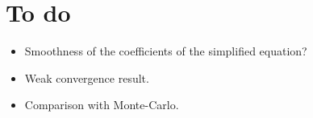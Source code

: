 \section*{To do}
\label{sec:to_do}
\begin{itemize}
   \item Smoothness of the coefficients of the simplified equation?
   \item Weak convergence result.
   \item Comparison with Monte-Carlo.
\end{itemize}
